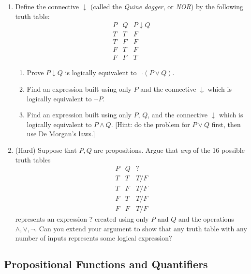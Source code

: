 \begin{enumerate}
   \item Define the connective $\downarrow$ (called the \emph{Quine dagger}, or \emph{NOR}) by the following truth table:
  \[
  \begin{array}{cc|c}
P & Q & P \downarrow Q\\\hline
T & T & F\\
T & F & F\\
F & T & F\\
F & F & T
\end{array}
  \]
  \begin{enumerate}
      \item Prove $P \downarrow Q$ is logically equivalent to $\neg (P \lor Q)$. 
      \item Find an expression built using only $P$ and the connective $\downarrow$ which is logically equivalent to $\neg P$.
      \item Find an expression built using only $P$, $Q$, and the connective $\downarrow$ which is logically equivalent to $P \land Q$. [Hint: do the problem for $P \lor Q$ first, then use De Morgan's laws.]
  \end{enumerate}
    
	\item (Hard) Suppose that $P,Q$ are propositions. Argue that \emph{any} of the 16 possible truth tables
	\[\begin{array}{cc|c}
	P&Q&?\\\hline
	T&T & T/F\\
	T&F & T/F\\
	F&T & T/F\\
	F&F & T/F
	\end{array}\]
	represents an expression ? created using only $P$ and $Q$ and the operations $\wedge,\vee,\neg$. Can you extend your argument to show that any truth table with any number of inputs represents some logical expression?
	
	
\end{enumerate}

\newpage











\subsection{Propositional Functions and Quantifiers}\label{sec:quant}

